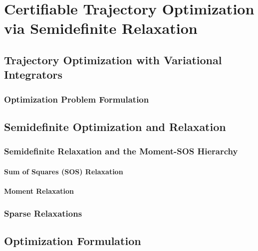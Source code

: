 \chapter{Certifiable Trajectory Optimization via Semidefinite Relaxation}
\label{chap:certifiable_trajectory_optimization}

\section{Trajectory Optimization with Variational Integrators}
\label{sec:trajectory_optimization_variational_integrators}

\subsection{Optimization Problem Formulation}
\label{sec:optimization_problem_formulation}

\newpage

\section{Semidefinite Optimization and Relaxation}
\label{sec:semidefinite_optimization_and_relaxation}

\subsection{Semidefinite Relaxation and the Moment-SOS Hierarchy}
\label{sec:sdp_moment_sos_relaxation}

\subsubsection{Sum of Squares (SOS) Relaxation}
\label{subsec:sos_relaxation}

\subsubsection{Moment Relaxation}
\label{subsec:moment_relaxation}

\subsection{Sparse Relaxations}
\label{sec:sparse_relaxations_cliques}

\newpage

\section{Optimization Formulation}

